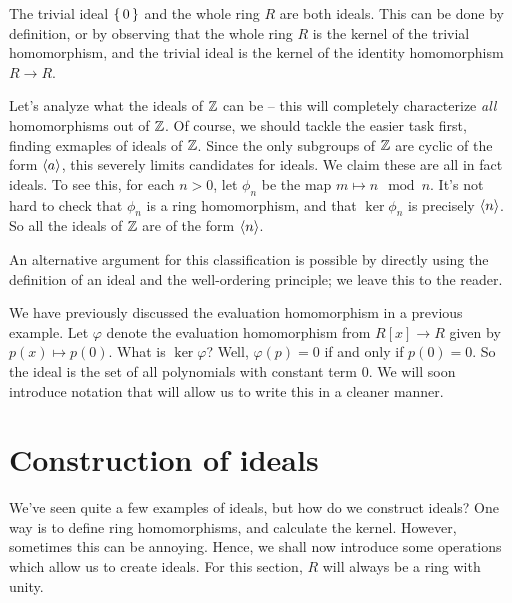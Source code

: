 \documentclass[./main.tex]{subfiles}
\begin{document}
\begin{example}
    The trivial ideal $\set{0}$ and the whole ring $R$ are both ideals. This can
    be done by definition, or by observing that the whole ring $R$ is the kernel
    of the trivial homomorphism, and the trivial ideal is the kernel of the
    identity homomorphism $R \to R$.
\end{example}

\begin{example}
    Let's analyze what the ideals of $\mathbb{Z}$ can be -- this will completely
    characterize \emph{all} homomorphisms out of $\mathbb{Z}$. Of course, we should
    tackle the easier task first, finding exmaples of ideals of $\mathbb{Z}$. Since the
    only subgroups of $\mathbb{Z}$ are cyclic of the form ${ \langle a \rangle }$, this severely
    limits candidates for ideals. We claim these are all in fact ideals. To see
    this, for each $n > 0$, let $\phi_n$ be the map $m \mapsto n \mod n$. It's
    not hard to check that $\phi_n$ is a ring homomorphism, and that $\ker
    \phi_n$ is precisely ${ \langle n \rangle }$. So all the ideals of $\mathbb{Z}$ are of the form
    ${ \langle n \rangle }$.
    
    An alternative argument for this classification is possible by directly
    using the definition of an ideal and the well-ordering principle; we leave
    this to the reader.
\end{example}

\begin{example}
    We have previously discussed the evaluation homomorphism in a previous
    example. Let $\varphi$ denote the evaluation homomorphism from $R[x] \to R$
    given by $p(x) \mapsto p(0)$. What is $\ker \varphi$? Well, $\varphi(p) = 0$
    if and only if $p(0) = 0$. So the ideal is the set of all polynomials with
    constant term 0. We will soon introduce notation that will allow us to write
    this in a cleaner manner.
\end{example}


\section{Construction of ideals}
We've seen quite a few examples of ideals, but how do we construct ideals? One
way is to define ring homomorphisms, and calculate the kernel. However,
sometimes this can be annoying. Hence, we shall now introduce some operations
which allow us to create ideals. For this section, $R$ will always be a ring
with unity.
\end{document}
